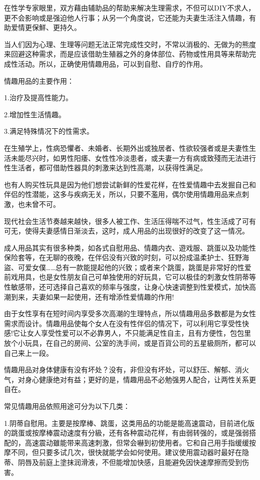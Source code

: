 \documentclass[12pt,UTF8]{ctexbook}
\begin{document}
在性学专家眼里，双方藉由辅助品的帮助来解决生理需求，不但可以DIY不求人，更不会影响或是强迫他人行事；从另一个角度说，它还能为夫妻生活注入情趣，有助爱情更保鮮、更持久。

当人们因为心理、生理等问题无法正常完成性交时，不常以消极的、无做为的熊度来回避这种需求，而是应该借助生殖器之外的身体部位、药物或性用具等来帮助完成性活动。所以，正确使用情趣用品，可以到自慰、自疗的作用。

情趣用品的主要作用：

1.治疗及提高性能力。

2.增加性生活情趣。

3.满足特殊情况下的性需求。

在生殖学上，性病恐懼者、未婚者、长期外出或独居者、性欲较强者或是夫妻性生活未能尽兴时，如男性阳痿、女性性冷淡患者，或夫妻一方有病或致殘而无法进行性生活者，都可借助性器具的刺激来达到性高潮，以获得性满足。

也有人购买性玩具是因为他们想尝试新鲜的性爱花样，在性爱情趣中去发掘自己和伴侣的性潜能，这多与疾病无关，所以，只要不濫用，偶尔使用情趣用品来点刺激，也未曾不可。

现代社会生活节奏越来越快，很多人被工作、生活压得喘不过气，性生活成了可有可无，使得夫妻感情日渐淡去，这时，成人用品的出现很好的改变了这一情况。

成人用品其实有很多种类，如各式自慰用品、情趣内衣、遊戏服、跳蛋以及功能性保险套等，在无聊的夜晚，在伴侣没有兴致的时刻，可以扮成温柔护士、狂野海盜、可爱女僕……总有一款能提起他的兴致；或者来个跳蛋，跳蛋是非常好的性爱前戏用具，也是女性朋友自己可单独使用的好玩具，它可以极佳的刺激女性阴蒂等性敏感带，还可选择自己喜欢的频率与强度，让身心快速调整到性爱模式，加快高潮到来，夫妻如果一起使用，还有增添性爱情趣的作用!

由于女性享有在短时间内享受多次高潮的生理特点，所以情趣用品多数都是为女性需求而设计。情趣用品使每个女人在没有性伴侣的情况下，可以利用它享受性快感!它让女人享受性爱可以不必靠男人，不只能满足性自主，且有方便性，包包里放个小玩具，在自己的房间、公室的洗手间，或是百貨公司的五星級厕所，都可以自己来上一段。

情趣用品对身体健康有没有坏处？没有，非但没有坏处，可以舒压、解郁、消火气，对身心健康绝对有益；更好的是，情趣用品不必勉强男人配合，让两性关系更自在。

常见情趣用品依照用途可分为以下几类：

1.阴蒂自慰用。主要是按摩棒、跳蛋，这类用品的功能是能高速震动，目前进化版的跳蛋或按摩棒震动速度有分級，还有各种震动花样，有由弱转强的，或是强弱搭配的，高速震动雖能带来高速刺激，但常会嚇到初使用者。它和自己用手指缓缓按摩不同，但只要多试几次，很快就能学会如何使用。建议使用震动器时最好在隐蒂、阴唇及前庭上塗抹润滑液，不但能增加快感，且能避免因快速摩擦而受到伤害。
\end{document}
